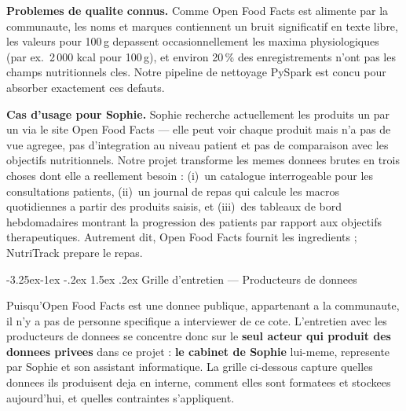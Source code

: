 \documentclass[a4paper,11pt,oneside,openany]{report}
\makeatletter
\renewcommand\subsection{\@startsection{subsection}{2}{\z@}%
  {-3.25ex\@plus -1ex \@minus -.2ex}%
  {1.5ex \@plus .2ex}%
  {\normalfont\large\bfseries\color{ntdarkgreen}}}
\newcommand{\off}{Open Food Facts}
\makeatother
\begin{document}
\textbf{Problemes de qualite connus.} Comme \off{} est alimente par
la communaute, les noms et marques contiennent un bruit significatif
en texte libre, les valeurs pour 100\,g depassent occasionnellement
les maxima physiologiques (par ex.\ 2\,000 kcal pour 100\,g), et
environ 20\,\% des enregistrements n'ont pas les champs nutritionnels
cles. Notre pipeline de nettoyage PySpark est concu pour absorber
exactement ces defauts.

\textbf{Cas d'usage pour Sophie.} Sophie recherche actuellement les
produits un par un via le site \off{} --- elle peut voir chaque
produit mais n'a pas de vue agregee, pas d'integration au niveau
patient et pas de comparaison avec les objectifs nutritionnels. Notre
projet transforme les memes donnees brutes en trois choses dont elle a
reellement besoin : (i)~un catalogue interrogeable pour les
consultations patients, (ii)~un journal de repas qui calcule les
macros quotidiennes a partir des produits saisis, et (iii)~des
tableaux de bord hebdomadaires montrant la progression des patients
par rapport aux objectifs therapeutiques. Autrement dit, \off{}
fournit les ingredients ; NutriTrack prepare le repas.

\subsection{Grille d'entretien --- Producteurs de donnees}

Puisqu'\off{} est une donnee publique, appartenant a la communaute,
il n'y a pas de personne specifique a interviewer de ce cote.
L'entretien avec les producteurs de donnees se concentre donc sur le
\textbf{seul acteur qui produit des donnees privees} dans ce projet :
\textbf{le cabinet de Sophie} lui-meme, represente par Sophie et son
assistant informatique. La grille ci-dessous capture quelles donnees
ils produisent deja en interne, comment elles sont formatees et
stockees aujourd'hui, et quelles contraintes s'appliquent.
\end{document}
